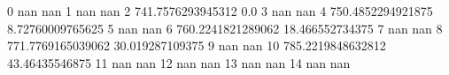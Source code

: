0 nan nan
1 nan nan
2 741.7576293945312 0.0
3 nan nan
4 750.4852294921875 8.72760009765625
5 nan nan
6 760.2241821289062 18.466552734375
7 nan nan
8 771.7769165039062 30.019287109375
9 nan nan
10 785.2219848632812 43.46435546875
11 nan nan
12 nan nan
13 nan nan
14 nan nan

